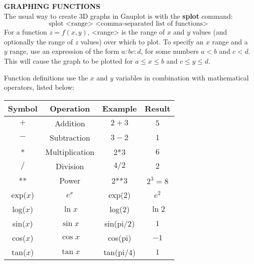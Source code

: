 \par\noindent\textbf{GRAPHING FUNCTIONS}\vspace{2mm}\\
The usual way to create 3D graphs in Gnuplot is with the \textbf{splot} command:
\begin{displaymath}
 \text{splot <range> <comma-separated list of functions>}
\end{displaymath}
For a function $z=f(x,y)$, <range> is the range of $x$ and $y$ values (and optionally the range of $z$ values) over
which to plot.
To specify an $x$ range and a $y$ range, use an expression of the form
$a:b$$c:d$, for some numbers $a<b$ and $c<d$. This will cause the graph to
be plotted for $a\le x\le b$ and $c\le y \le d$.\vspace{2mm}

\par\noindent Function definitions use the $x$ and $y$ variables in combination with mathematical operators,
listed below:\vspace{1mm}

\begin{center}
\begin{tabular}{@{} | c | c | c | c | @{}}
 \hline \textbf{Symbol} & \textbf{Operation} & \textbf{Example} & \textbf{Result}\\
 \hline $+$ & Addition & $2 + 3$ & $5$\\
 \hline $-$ & Subtraction & $3 - 2$ & $1$\\
 \hline * & Multiplication & $2$*$3$ & $6$\\
 \hline $/$ & Division & $4/2$ & $2$\\
 \hline ** & Power & $2$**$3$ & $2^3 = 8$\\
 \hline exp($x$) & $e^x$ & exp($2$) & $e^2$\\
 \hline log($x$) & $\ln x$ & log($2$) & $\ln 2$\\
 \hline sin($x$) & $\sin x$ & sin(pi/$2$) & $1$\\
 \hline cos($x$) & $\cos x$ & cos(pi) & $-1$\\
 \hline tan($x$) & $\tan x$ & tan(pi/$4$) & $1$\\\hline
\end{tabular}\end{center}

